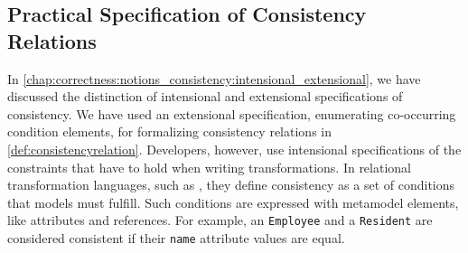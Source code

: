 


\subsection{Practical Specification of Consistency Relations}

In \autoref{chap:correctness:notions_consistency:intensional_extensional}, we have discussed the distinction of intensional and extensional specifications of consistency.
We have used an extensional specification, enumerating co-occurring condition elements, for formalizing consistency relations in \autoref{def:consistencyrelation}.
Developers, however, use intensional specifications of the constraints that have to hold when writing transformations.
In relational transformation languages, such as \qvtr, they define consistency as a set of conditions that models must fulfill.
Such conditions are expressed with metamodel elements, like attributes and references. 
For example, an \texttt{Employee} and a \texttt{Resident} are considered consistent if their \texttt{name} attribute values are equal.

